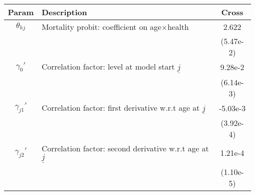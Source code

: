 \begin{table}[ht]\label{CrossWomenCorrParams}
\footnotesize
\begin{center}
\begin{tabular}{clc}
\hline \hline
Param & Description & Cross \\
\hline
$\theta_{hj}$ & Mortality probit: coefficient on age$\times$health & 2.622 \\
 & & (5.47e-2) \\
$\gamma_{0}'$ & Correlation factor: level at model start $\underline{j}$ & 9.28e-2 \\
 & & (6.14e-3) \\
$\gamma_{j1}'$ & Correlation factor: first derivative w.r.t age at $\underline{j}$ & -5.03e-3 \\
 & & (3.92e-4) \\
$\gamma_{j2}'$ & Correlation factor: second derivative w.r.t age at $\underline{j}$ & 1.21e-4 \\
 & & (1.10e-5) \\
\hline\hline
\end{tabular}
\end{center}
\end{table}

